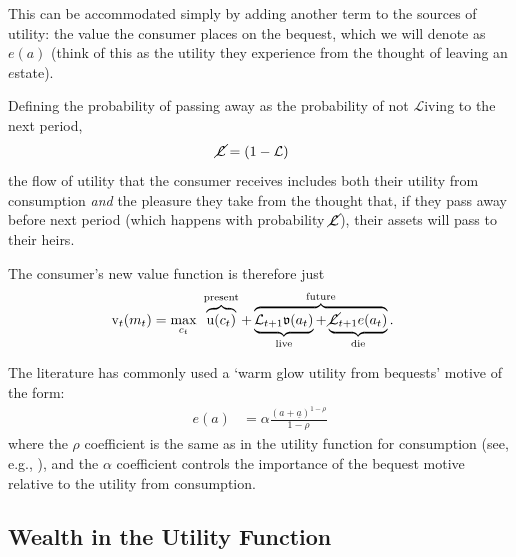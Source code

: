 \documentclass{article}
\newcommand{\CRRA}{\rho}
\newcommand{\uFunc}{\mathrm{u}}
\newcommand{\vFunc}{\mathrm{v}}
\newcommand{\Alive}{\mathcal{L}}
\newcommand{\cNrm}{c}
\newcommand{\aNrm}{a}
\newcommand{\mNrm}{m}
\newcommand{\bqstNrm}{e}
\begin{document}
This can be accommodated simply by adding another term to the sources of utility: the value the consumer places on the bequest, which we will denote as $\bqstNrm(\aNrm)$ (think of this as the utility they experience from the thought of leaving an $\bqstNrm$state).

Defining the probability of passing away as the probability of not $\Alive$iving to the next period,
\begin{align}
    \cancel{\Alive} & =(1-\Alive)
\end{align}
the flow of utility that the consumer receives includes both their utility from consumption \textit{and} the pleasure they take from the thought that, if they pass away before next period (which happens with probability $\cancel{\Alive}$), their assets will pass to their heirs.

The consumer's new value function is therefore just
\begin{align}
    {\vFunc}_{t}({\mNrm}_{t}) & = \max_{\cNrm_{t}} ~ \overbrace{\uFunc(\cNrm_{t})}^{\text{present}}+\overbrace{\underbrace{\Alive_{t+1}\mathfrak{v}(\aNrm_{t})}_{\text{live}} + \underbrace{\cancel{\Alive}_{t+1}\bqstNrm({\aNrm}_{t})}_{\text{die}}
    }^{\text{future}}.
\end{align}

The literature has commonly used a `warm glow utility from bequests' motive of the form:
\begin{align}
    \bqstNrm(a) & = \alpha\frac{(a+\underline{a})^{1-\CRRA}}{1-\CRRA}
\end{align}
where the $\CRRA$ coefficient is the same as in the utility function for consumption (see, e.g., \cite{deNardiBequest}), and the $\alpha$ coefficient controls the importance of the bequest motive relative to the utility from consumption.

\subsection{Wealth in the Utility Function}
\end{document}
